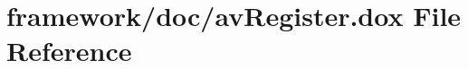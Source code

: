 \hypertarget{av_register_8dox}{}\section{framework/doc/av\+Register.dox File Reference}
\label{av_register_8dox}
